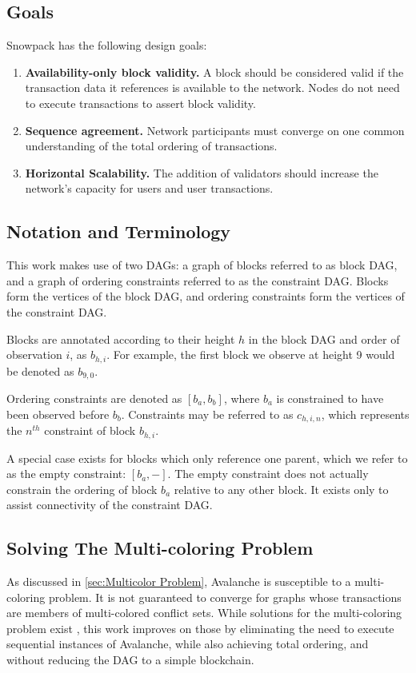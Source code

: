 \documentclass[12pt]{article}
\begin{document}
\subsection{Goals}
  Snowpack has the following design goals:

\begin{enumerate}
  \item \textbf{Availability-only block validity.} A block should be considered
    valid if the transaction data it references is available to the network.
    Nodes do not need to execute transactions to assert block validity.
    \label{goal:availability}
  \item \textbf{Sequence agreement.} Network participants must converge
    on one common understanding of the total ordering of transactions.
    \label{goal:agreement}
  \item \textbf{Horizontal Scalability.} The addition of validators should increase the
    network's capacity for users and user transactions.
    \label{goal:scalability}
\end{enumerate}

\subsection{Notation and Terminology}
  This work makes use of two DAGs: a graph of blocks referred to as block DAG,
  and a graph of ordering constraints referred to as the constraint DAG. Blocks
  form the vertices of the block DAG, and ordering constraints form the
  vertices of the constraint DAG.

  Blocks are annotated according to their height $h$ in the block DAG and order
  of observation $i$, as $b_{h,i}$. For example, the first block we observe at
  height 9 would be denoted as $b_{9,0}$.

  Ordering constraints are denoted as $[b_a, b_b]$, where $b_a$ is constrained
  to have been observed before $b_b$. Constraints may be referred to as $c_{h,i,n}$, which
  represents the $n^{th}$ constraint of block $b_{h,i}$.

  A special case exists for blocks which only reference one parent, which we
  refer to as the empty constraint: $[b_a, -]$. The empty constraint does not
  actually constrain the ordering of block $b_a$ relative to any other block.
  It exists only to assist connectivity of the constraint DAG.

\subsection{Solving The Multi-coloring Problem}
  As discussed in \ref{sec:Multicolor Problem}, Avalanche is susceptible to a
  multi-coloring problem. It is not guaranteed to converge for graphs whose
  transactions are members of multi-colored conflict sets. While solutions for
  the multi-coloring problem exist \cite{buchwald2024frosty}, this work
  improves on those by eliminating the need to execute sequential instances of
  Avalanche, while also achieving total ordering, and without reducing the DAG
  to a simple blockchain.
\end{document}
